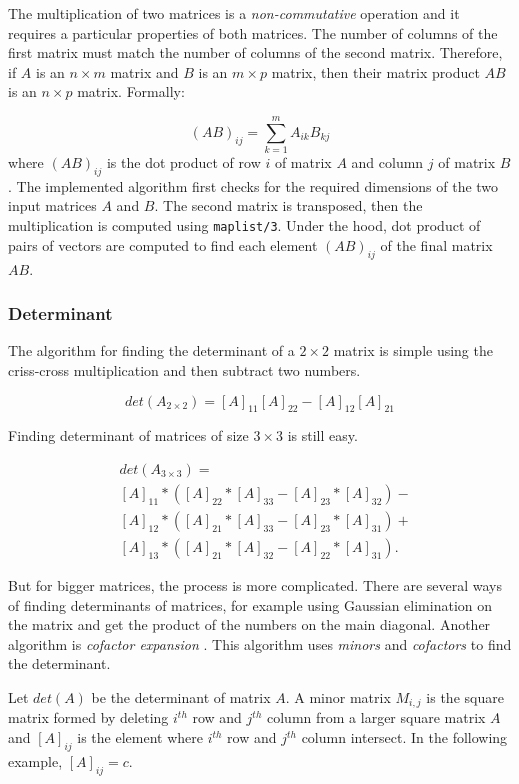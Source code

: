 \documentclass[a4paper]{article}
\begin{document}
The multiplication of two matrices is a \textit{non-commutative} operation and it requires a particular properties of both matrices. The number of columns of the first matrix must match the number of columns of the second matrix. Therefore, if $A$ is an $n \times m$ matrix and $B$ is an $m \times p$ matrix, then their matrix product $AB$ is an $n \times p$ matrix. Formally:

\[(AB)_{ij} = \sum_{k=1}^mA_{ik}B_{kj}\]
where $(AB)_{ij}$ is the dot product of row $i$ of matrix $A$ and column $j$ of matrix $B$. The implemented algorithm first checks for the required dimensions of the two input matrices $A$ and $B$. The second matrix is transposed, then the multiplication is computed using \texttt{maplist/3}. Under the hood, dot product of pairs of vectors are computed to find each element $(AB)_{ij}$ of the final matrix $AB$.

\subsubsection{Determinant}
The algorithm for finding the determinant of a $2\times2$ matrix is simple using the criss-cross multiplication and then subtract two numbers.

\[det(A_{2 \times 2}) = [A]_{11}[A]_{22} - [A]_{12}[A]_{21} \]

Finding determinant of matrices of size $3\times3$ is still easy.

\[
\begin{aligned}
  & det(A_{3 \times 3}) = \\  
  & [A]_{11} * ([A]_{22} * [A]_{33} - [A]_{23} * [A]_{32}) - \\
  & [A]_{12} * ([A]_{21} * [A]_{33} - [A]_{23} * [A]_{31}) + \\
  & [A]_{13} * ([A]_{21} * [A]_{32} - [A]_{22} * [A]_{31}).
\end{aligned}
\]

But for bigger matrices, the process is more complicated. There are several ways of finding determinants of matrices, for example using Gaussian elimination on the matrix and get the product of the numbers on the main diagonal. Another algorithm is \textit{cofactor expansion} \cite{stapel2}. This algorithm uses \textit{minors} and \textit{cofactors} to find the determinant.

Let $det(A)$ be the determinant of matrix $A$. A minor matrix $M_{i,j}$ is the square matrix formed by deleting $i^{th}$ row and $j^{th}$ column from a larger square matrix $A$ and $[A]_{ij}$ is the element where $i^{th}$ row and $j^{th}$ column intersect. In the following example, $[A]_{ij} = c$.
\end{document}
